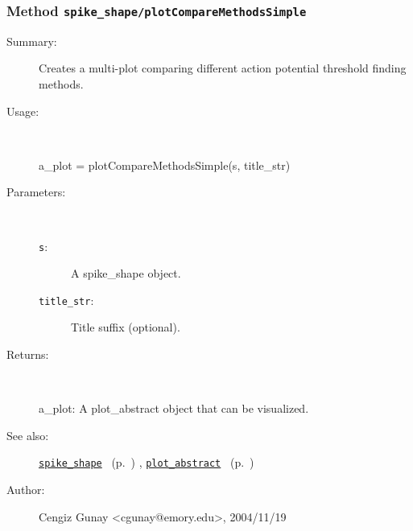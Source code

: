 \subsubsection[Method \texttt{plotCompareMethodsSimple}]{Method \texttt{spike\_shape/plotCompareMethodsSimple}}%
%
\label{ref_spike_shape__plotCompareMethodsSimple}%
\hypertarget{ref_spike_shape__plotCompareMethodsSimple}{}%
\begin{description}
\item[Summary:]Creates a multi-plot comparing different action potential
			threshold finding methods.
%
\item[Usage:]~%
\begin{lyxcode}%
a\_plot = plotCompareMethodsSimple(s, title\_str)
%
\end{lyxcode}%
%
%
\item[Parameters:]~
\begin{description}%
\item[\texttt{s}:]
 A spike\_shape object.
\item[\texttt{title\_str}:]
 Title suffix (optional).
\end{description}%
%
\item[Returns:]~

	a\_plot: A plot\_abstract object that can be visualized.
%
%
\item[See also:]%
\hyperlink{ref_spike_shape}{\texttt{spike\_shape}}%
\ (p.~\pageref{ref_spike_shape})%
%
, \hyperlink{ref_plot_abstract}{\texttt{plot\_abstract}}%
\ (p.~\pageref{ref_plot_abstract})%
%
%
\item[Author:]%
Cengiz Gunay <cgunay@emory.edu>, 2004/11/19%
\end{description}
\methodline%
